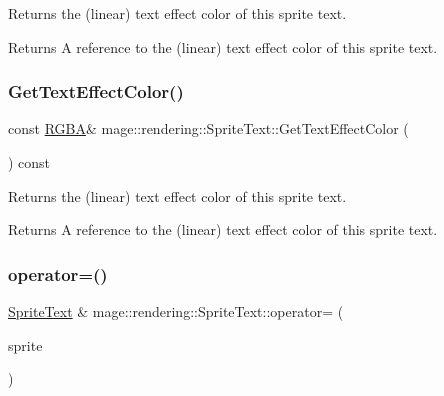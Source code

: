 Returns the (linear) text effect color of this sprite text.

\begin{DoxyReturn}{Returns}
A reference to the (linear) text effect color of this sprite text. 
\end{DoxyReturn}
\mbox{\label{classmage_1_1rendering_1_1_sprite_text_a7705f00b0172153d52f31f170b12968f}} 
\subsubsection{\texorpdfstring{Get\+Text\+Effect\+Color()}{GetTextEffectColor()}\hspace{0.1cm}{\footnotesize\ttfamily [2/2]}}
{\footnotesize\ttfamily const \mbox{\hyperlink{structmage_1_1_r_g_b_a}{R\+G\+BA}}\& mage\+::rendering\+::\+Sprite\+Text\+::\+Get\+Text\+Effect\+Color (\begin{DoxyParamCaption}{ }\end{DoxyParamCaption}) const\hspace{0.3cm}{\ttfamily [noexcept]}}

Returns the (linear) text effect color of this sprite text.

\begin{DoxyReturn}{Returns}
A reference to the (linear) text effect color of this sprite text. 
\end{DoxyReturn}
\mbox{\label{classmage_1_1rendering_1_1_sprite_text_a50d21c24a019c0e8dc053a307ec421a6}} 
\subsubsection{\texorpdfstring{operator=()}{operator=()}\hspace{0.1cm}{\footnotesize\ttfamily [1/2]}}
{\footnotesize\ttfamily \mbox{\hyperlink{classmage_1_1rendering_1_1_sprite_text}{Sprite\+Text}} \& mage\+::rendering\+::\+Sprite\+Text\+::operator= (\begin{DoxyParamCaption}\item[{const \mbox{\hyperlink{classmage_1_1rendering_1_1_sprite_text}{Sprite\+Text}} \&}]{sprite }\end{DoxyParamCaption})\hspace{0.3cm}{\ttfamily [default]}}

